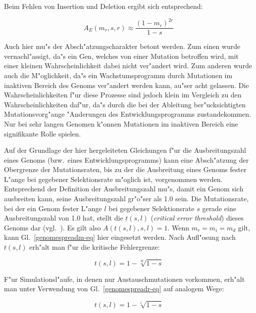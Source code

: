 Beim Fehlen von Insertion und Deletion ergibt sich entsprechend:

\begin{equation}
\label{programspreadr-eq}
A_E(m_r, s, r) \approx \frac{(1-m_r)^{2r}}{1-s}
\end{equation}

Auch hier mu"s der Absch"atzungscharakter betont werden. Zum einen wurde 
vernachl"assigt, da"s ein Gen, welches von einer Mutation betroffen wird, mit einer kleinen
Wahrscheinlichkeit dabei nicht ver"andert wird. Zum anderen wurde auch die M"oglichkeit, da"s
ein Wachstumsprogramm durch Mutationen im inaktiven Bereich des Genoms ver"andert werden
kann, au"ser acht gelassen. Die Wahrscheinlichkeiten f"ur diese Prozesse sind jedoch klein
im Vergleich zu den Wahrscheinlichkeiten daf"ur, da"s durch die bei der Ableitung ber"ucksichtigten
Mutationsvorg"ange "Anderungen des Entwicklungsprogramms zustandekommen.
Nur bei sehr langen Genomen k"onnen Mutationen im inaktiven Bereich eine signifikante Rolle
spielen.

Auf der Grundlage der hier hergeleiteten Gleichungen f"ur die Ausbreitungszahl eines Genoms (bzw.\ eines
Entwicklungsprogramms) kann eine Absch"atzung der Obergrenze der Mutationsraten, bis zu der die Ausbreitung
eines Genoms fester L"ange bei gegebener Selektionsrate m"oglich ist, vorgenommen werden.
Entsprechend der Definition der Ausbreitungszahl mu"s, damit ein Genom sich ausbreiten
kann, seine Ausbreitungszahl gr"o"ser als 1.0 sein.
Die Mutationsrate, bei der ein Genom fester L"ange $l$ bei gegebener Selektionsrate $s$ gerade eine Ausbreitungszahl
von 1.0 hat, stellt die  $t(s,l)$ ({\slshape critical error threshold}) dieses Genoms dar
(vgl.\ \cite{Maynard89}). Es gilt also $A(t(s,l), s, l) = 1$. Wenn $m_r = m_i = m_d$ gilt, kann
Gl.\ \ref{genomespreadm-eq} hier eingesetzt werden.
Nach Aufl"osung nach $t(s,l)$ erh"alt man f"ur die kritische Fehlergrenze:

\begin{equation}
\label{errthresholdm-eq}
t(s,l) = 1-\sqrt[3l]{1-s}
\end{equation}

F"ur Simulationsl"aufe, in denen nur Austauschmutationen vorkommen, erh"alt man unter Verwendung von Gl.\ \ref{genomespreadr-eq}
auf analogem Wege:

\begin{equation}
\label{errthresholdr-eq}
t(s,l) = 1-\sqrt[l]{1-s}
\end{equation}

